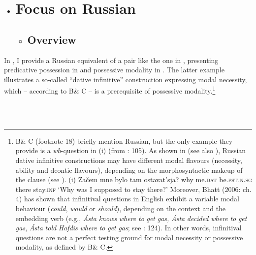 \documentclass[output=paper,modfonts,nonflat]{langsci/langscibook}
\begin{document}
\begin{itemize}
\item \section{ Focus on Russian} 

\begin{itemize}
\item \subsection{Overview}
\end{itemize}
\end{itemize}

In , I provide a Russian equivalent of a pair like the one in , presenting predicative possession in  and possessive modality in . The latter example illustrates a so-called “dative infinitive” construction expressing modal necessity, which – according to B\& C – is a prerequisite of possessive modality.\footnote{B\& C (footnote 18) briefly mention Russian, but the only example they provide is a \textit{wh}{}-question in (i) (from \citealt{Jung2011}: 105). As shown in \citet{Tsedryk2018} (see also \citealt{Fortuin2007}), Russian dative infinitive constructions may have different modal flavours (necessity, ability and deontic flavours), depending on the morphosyntactic makeup of the clause (see ).   (i)  Začem  mne       bylo          tam     ostavat’sja?    why     me.\textsc{dat}   be.\textsc{pst.n.sg}  there   stay.\textsc{inf}    ‘Why was I supposed to stay there?’      Moreover, Bhatt (2006: ch. 4) has shown that infinitival questions in English exhibit a variable modal behaviour (\textit{could}, \textit{would} or \textit{should}), depending on the context and the embedding verb (e.g., \textit{Ásta} \textit{knows} \textit{where} \textit{to} \textit{get} \textit{gas,} \textit{Ásta} \textit{decided} \textit{where} \textit{to} \textit{get} \textit{gas}, \textit{Ásta} \textit{told} \textit{Hafdis} \textit{where} \textit{to} \textit{get} \textit{gas}; see \citealt{Bhatt2006}: 124). In other words, infinitival questions are not a perfect testing ground for modal necessity or possessive modality, as defined by B\& C.} 

\ea%
    \label{ex:key:6}
    \gll\\
        \\
    \glt
    \z
\end{document}
